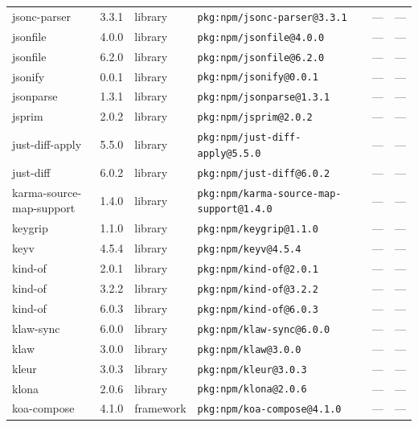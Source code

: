 \documentclass[11pt,a4paper]{article}
\begin{document}
\begin{longtable}{|p{4cm}|p{2cm}|p{1.6cm}|p{5cm}|p{1.5cm}|p{3.5cm}|}
\raggedright jsonc-parser & 3.3.1 & library & \small\texttt{pkg:npm/jsonc-parser@3.3.1} & — & \small — \\
\raggedright jsonfile & 4.0.0 & library & \small\texttt{pkg:npm/jsonfile@4.0.0} & — & \small — \\
\raggedright jsonfile & 6.2.0 & library & \small\texttt{pkg:npm/jsonfile@6.2.0} & — & \small — \\
\raggedright jsonify & 0.0.1 & library & \small\texttt{pkg:npm/jsonify@0.0.1} & — & \small — \\
\raggedright jsonparse & 1.3.1 & library & \small\texttt{pkg:npm/jsonparse@1.3.1} & — & \small — \\
\raggedright jsprim & 2.0.2 & library & \small\texttt{pkg:npm/jsprim@2.0.2} & — & \small — \\
\raggedright just-diff-apply & 5.5.0 & library & \small\texttt{pkg:npm/just-diff-apply@5.5.0} & — & \small — \\
\raggedright just-diff & 6.0.2 & library & \small\texttt{pkg:npm/just-diff@6.0.2} & — & \small — \\
\raggedright karma-source-map-support & 1.4.0 & library & \small\texttt{pkg:npm/karma-source-map-support@1.4.0} & — & \small — \\
\raggedright keygrip & 1.1.0 & library & \small\texttt{pkg:npm/keygrip@1.1.0} & — & \small — \\
\raggedright keyv & 4.5.4 & library & \small\texttt{pkg:npm/keyv@4.5.4} & — & \small — \\
\raggedright kind-of & 2.0.1 & library & \small\texttt{pkg:npm/kind-of@2.0.1} & — & \small — \\
\raggedright kind-of & 3.2.2 & library & \small\texttt{pkg:npm/kind-of@3.2.2} & — & \small — \\
\raggedright kind-of & 6.0.3 & library & \small\texttt{pkg:npm/kind-of@6.0.3} & — & \small — \\
\raggedright klaw-sync & 6.0.0 & library & \small\texttt{pkg:npm/klaw-sync@6.0.0} & — & \small — \\
\raggedright klaw & 3.0.0 & library & \small\texttt{pkg:npm/klaw@3.0.0} & — & \small — \\
\raggedright kleur & 3.0.3 & library & \small\texttt{pkg:npm/kleur@3.0.3} & — & \small — \\
\raggedright klona & 2.0.6 & library & \small\texttt{pkg:npm/klona@2.0.6} & — & \small — \\
\raggedright koa-compose & 4.1.0 & framework & \small\texttt{pkg:npm/koa-compose@4.1.0} & — & \small — \\

\end{longtable}
\end{document}
